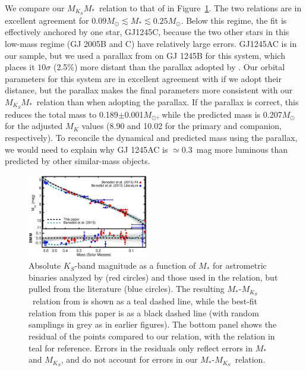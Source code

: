 \documentclass[twocolumn]{aastex62}
\newcommand{\mks}{$M_{K_S}$}
\newcommand{\mmk}{$M_{K_S}$\textendash$M_*$}
\begin{document}
We compare our \mmk\ relation to that of \citet{Benedict2016} in Figure~\ref{fig:benedict}. The two relations are in excellent agreement for $0.09M_\odot\lesssim M_* \lesssim 0.25M_\odot$. Below this regime, the \citet{Benedict2016} fit is effectively anchored by one star, GJ1245C, because the two other stars in this low-mass regime (GJ 2005B and C) have relatively large errors. GJ1245AC is in our sample, but we used a parallax from \citet{GaiaDr2} on GJ 1245B for this system, which places it $10\sigma$ (2.5\%) more distant than the parallax adopted by \citet{Benedict2016}. Our orbital parameters for this system are in excellent agreement with \citet{Benedict2016} if we adopt their distance, but the \citet{GaiaDr2} parallax makes the final parameters more consistent with our \mmk\ relation than when adopting the \citet{Benedict2016} parallax. If the \citet{Benedict2016} parallax is correct, this reduces the total mass to 0.189$\pm$0.001$M_\odot$, while the predicted mass is 0.207$M_\odot$ for the adjusted $M_K$ values (8.90 and 10.02 for the primary and companion, respectively). To reconcile the dynamical and predicted mass using the \citet{Benedict2016} parallax, we would need to explain why GJ 1245AC is $\simeq$0.3~mag more luminous than predicted by other similar-mass objects.


\begin{figure}[htb]
\begin{center}
\includegraphics[width=0.47\textwidth]{Benedict_comp.eps}
\caption{Absolute $K_S$-band magnitude as a function of $M_*$ for astrometric binaries analyzed by \citet{Benedict2016} (red circles) and those used in the \citet{Benedict2016} relation, but pulled from the literature (blue circles). The resulting $M_*$-\mks\ relation from \citet{Benedict2016} is shown as a teal dashed line, while the best-fit relation from this paper is as a black dashed line (with random samplings in grey as in earlier figures). The bottom panel shows the residual of the \citet{Benedict2016} points compared to our relation, with the \citet{Benedict2016} relation in teal for reference. Errors in the residuals only reflect errors in $M_*$ and \mks, and do not account for errors in our $M_*$-\mks\ relation. }
\label{fig:benedict}
\end{center}
\end{figure}
\end{document}
